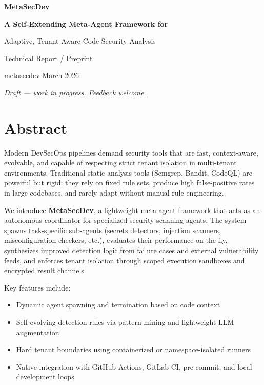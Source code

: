 \documentclass[10pt,a4paper]{article}
\begin{document}
\begin{titlepage}
    \centering
    \vspace*{1.8cm}

    {\Huge\bfseries MetaSecDev\par}
    \vspace{0.4cm}
    {\huge\bfseries A Self-Extending Meta-Agent Framework for\par Adaptive, Tenant-Aware Code Security Analysis\par}
    \vspace{1.8cm}

    {\Large Technical Report / Preprint\par}
    \vspace{1.2cm}

    {\large metasecdev \quad\quad March 2026\par}
    \vfill

    \textit{Draft — work in progress. Feedback welcome.}
\end{titlepage}

\tableofcontents
\newpage

\section{Abstract}
Modern DevSecOps pipelines demand security tools that are fast, context-aware, evolvable, and capable of respecting strict tenant isolation in multi-tenant environments. Traditional static analysis tools (Semgrep, Bandit, CodeQL) are powerful but rigid: they rely on fixed rule sets, produce high false-positive rates in large codebases, and rarely adapt without manual rule engineering.

We introduce \textbf{MetaSecDev}, a lightweight meta-agent framework that acts as an autonomous coordinator for specialized security scanning agents. The system spawns task-specific sub-agents (secrets detectors, injection scanners, misconfiguration checkers, etc.), evaluates their performance on-the-fly, synthesizes improved detection logic from failure cases and external vulnerability feeds, and enforces tenant isolation through scoped execution sandboxes and encrypted result channels.

Key features include:
\begin{itemize}
    \item Dynamic agent spawning and termination based on code context
    \item Self-evolving detection rules via pattern mining and lightweight LLM augmentation
    \item Hard tenant boundaries using containerized or namespace-isolated runners
    \item Native integration with GitHub Actions, GitLab CI, pre-commit, and local development loops
\end{itemize}
\end{document}
